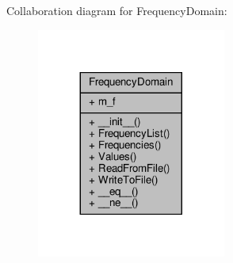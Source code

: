 Collaboration diagram for Frequency\+Domain\+:\nopagebreak
\begin{figure}[H]
\begin{center}
\leavevmode
\includegraphics[width=176pt]{classSignalIntegrity_1_1FrequencyDomain_1_1FrequencyDomain_1_1FrequencyDomain__coll__graph}
\end{center}
\end{figure}
